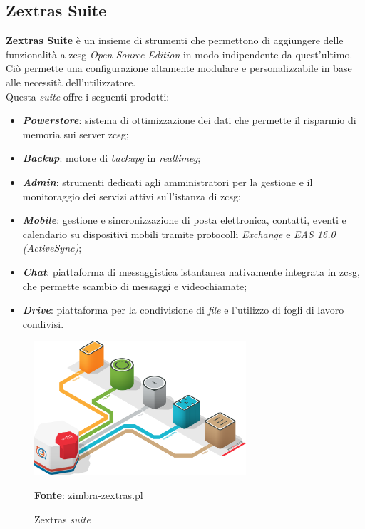     \subsection{Zextras Suite}
        \textbf{Zextras Suite} è un insieme di strumenti che permettono di aggiungere delle funzionalità a \gls{zcsg} \textit{Open Source Edition} in modo indipendente da quest'ultimo. Ciò permette una configurazione altamente modulare e personalizzabile in base alle necessità dell'utilizzatore. \\
        Questa \textit{suite} offre i seguenti prodotti:
        \begin{itemize}
            \setlength\itemsep{0em}
            \item \textit{\textbf{Powerstore}}: sistema di ottimizzazione dei dati che permette il risparmio di memoria sui server \gls{zcsg};
            \item \textit{\textbf{Backup}}: motore di \textit{\gls{backupg}} in \textit{\gls{realtimeg}};
            \item \textit{\textbf{Admin}}: strumenti dedicati agli amministratori per la gestione e il monitoraggio dei servizi attivi sull'istanza di \gls{zcsg};
            \item \textit{\textbf{Mobile}}: gestione e sincronizzazione di posta elettronica, contatti, eventi e calendario su dispositivi mobili tramite protocolli \textit{Exchange} e \textit{EAS 16.0 (ActiveSync)};
            \item \textit{\textbf{Chat}}: piattaforma di messaggistica istantanea nativamente integrata in \gls{zcsg}, che permette scambio di messaggi e videochiamate;
            \item \textit{\textbf{Drive}}: piattaforma per la condivisione di \textit{file} e l'utilizzo di fogli di lavoro condivisi.
        \end{itemize}
        
        \begin{figure}[ht]
            \centering
            \includegraphics[width=0.7\textwidth]{immagini/zextras_suite.png}
            \caption{Zextras \textit{suite}}
            \textbf{Fonte}: \href{https://www.zimbra-zextras.pl/}{zimbra-zextras.pl}
            \label{fig: Zextras suite}
        \end{figure}
        
